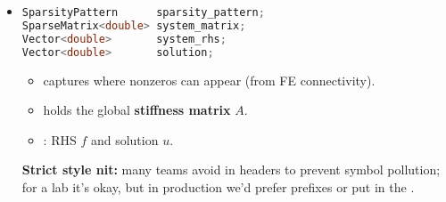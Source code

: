 \begin{itemize}
\begin{itemize}
         is our \textbf{finite element type}, it tells 
        \begin{itemize}
            \item What the \textbf{local basis functions} are on each cell $K$;
            \item Where the \textbf{degrees of freedom (DoFs)} live (endpoints, midpoints, ...);
            \item How to get \textbf{shape values} $\phi_{i}\left(x_{q}\right)$ and \textbf{gradients} $\phi_{i}'(x_{q})$ at\break quadrature points;
            \item How many \textbf{DoFs per cells} there are, etc.
        \end{itemize}
        \item Same idea for : we'll usually pick  in .
        \item {} binds FE to the mesh and assigns \textbf{global DoF indices} (the algebraic unknowns).
    \end{itemize}
    \textbf{Lifetime ordering}: class members are destroyed in the \textbf{reverse} order of their declaration in . Here,  is declared \textbf{after} , so it is destroyed \textbf{before}  $\rightarrow$ this is the safe order required by  (the handler must not outlive the mesh).


    \newpage


    \item {}
    \begin{lstlisting}[language=C++]
SparsityPattern      sparsity_pattern;
SparseMatrix<double> system_matrix;
Vector<double>       system_rhs;
Vector<double>       solution;\end{lstlisting}
    \begin{itemize}
        \item {} captures where nonzeros can appear (from FE connectivity).
        \item {} holds the global \textbf{stiffness matrix} $A$.
        \item {}: RHS $f$ and solution $u$.
    \end{itemize}
    \textcolor{Red2}{ \textbf{Strict style nit:}} many teams avoid  in headers to prevent symbol pollution; for a lab it's okay, but in production we'd prefer  prefixes or put  in the .
\end{itemize}